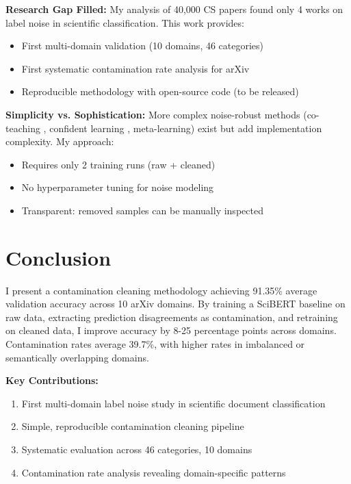 \documentclass{article}
\begin{document}
\textbf{Research Gap Filled:} My analysis of 40,000 CS papers found only 4 works on label noise in scientific classification. This work provides:
\begin{itemize}
    \item First multi-domain validation (10 domains, 46 categories)
    \item First systematic contamination rate analysis for arXiv
    \item Reproducible methodology with open-source code (to be released)
\end{itemize}

\textbf{Simplicity vs. Sophistication:} More complex noise-robust methods (co-teaching \cite{han2018co}, confident learning \cite{northcutt2021confident}, meta-learning) exist but add implementation complexity. My approach:
\begin{itemize}
    \item Requires only 2 training runs (raw + cleaned)
    \item No hyperparameter tuning for noise modeling
    \item Transparent: removed samples can be manually inspected
\end{itemize}

\section{Conclusion}

I present a contamination cleaning methodology achieving 91.35\% average validation accuracy across 10 arXiv domains. By training a SciBERT baseline on raw data, extracting prediction disagreements as contamination, and retraining on cleaned data, I improve accuracy by 8-25 percentage points across domains. Contamination rates average 39.7\%, with higher rates in imbalanced or semantically overlapping domains.

\textbf{Key Contributions:}
\begin{enumerate}
    \item First multi-domain label noise study in scientific document classification
    \item Simple, reproducible contamination cleaning pipeline
    \item Systematic evaluation across 46 categories, 10 domains
    \item Contamination rate analysis revealing domain-specific patterns
\end{enumerate}
\end{document}
